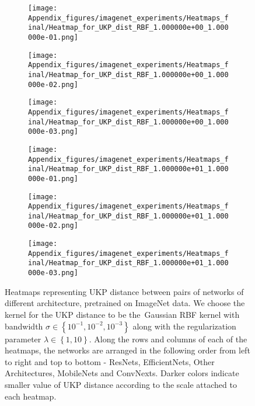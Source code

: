 \documentclass{article} %
\newcommand{\metricstname}{UKP }
\theoremstyle{plain}
\begin{document}
\begin{figure}[!h]
    \centering
    \begin{subfigure}[b]{0.3\textwidth}
        \texttt{[image: Appendix\_figures/imagenet\_experiments/Heatmaps\_final/Heatmap\_for\_UKP\_dist\_RBF\_1.000000e+00\_1.000000e-01.png]}
    \end{subfigure}
    \hfill
    \begin{subfigure}[b]{0.3\textwidth}
        \texttt{[image: Appendix\_figures/imagenet\_experiments/Heatmaps\_final/Heatmap\_for\_UKP\_dist\_RBF\_1.000000e+00\_1.000000e-02.png]}
    \end{subfigure}
    \hfill
    \begin{subfigure}[b]{0.3\textwidth}
        \texttt{[image: Appendix\_figures/imagenet\_experiments/Heatmaps\_final/Heatmap\_for\_UKP\_dist\_RBF\_1.000000e+00\_1.000000e-03.png]}
    \end{subfigure}
    
    \vspace{0.5cm}  %
    
    \begin{subfigure}[b]{0.3\textwidth}
        \texttt{[image: Appendix\_figures/imagenet\_experiments/Heatmaps\_final/Heatmap\_for\_UKP\_dist\_RBF\_1.000000e+01\_1.000000e-01.png]}
    \end{subfigure}
    \hfill
    \begin{subfigure}[b]{0.3\textwidth}
        \texttt{[image: Appendix\_figures/imagenet\_experiments/Heatmaps\_final/Heatmap\_for\_UKP\_dist\_RBF\_1.000000e+01\_1.000000e-02.png]}
    \end{subfigure}
    \hfill
    \begin{subfigure}[b]{0.3\textwidth}
        \texttt{[image: Appendix\_figures/imagenet\_experiments/Heatmaps\_final/Heatmap\_for\_UKP\_dist\_RBF\_1.000000e+01\_1.000000e-03.png]}
    \end{subfigure}
    
     \caption{Heatmaps representing \metricstname distance between pairs of networks of different architecture, pretrained on ImageNet data. We choose the kernel for the \metricstname distance to be the Gaussian RBF kernel with bandwidth $\sigma \in \left\{10^{-1},10^{-2},10^{-3}\right\}$ along with the regularization parameter $\lambda \in \left\{1,10\right\}$. Along the rows and columns of each of the heatmaps, the networks are arranged in the following order from left to right and top to bottom - ResNets, EfficientNets, Other Architectures, MobileNets and ConvNexts. Darker colors indicate smaller value of \metricstname distance according to the scale attached to each heatmap.}
    \label{ImageNet heatmaps}
\end{figure}
\end{document}
